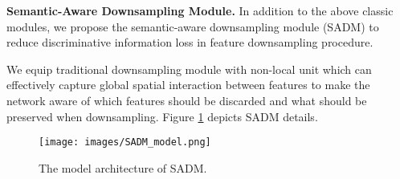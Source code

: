 \documentclass[final]{cvpr}
\begin{document}
\textbf{Semantic-Aware Downsampling Module.}
In addition to the above classic modules, we propose the semantic-aware downsampling module (SADM) to reduce discriminative information loss in feature downsampling procedure.

We equip traditional downsampling module with non-local \cite{wang2018non} unit which can effectively capture global spatial interaction between features to make the network aware of which features should be discarded and what should be preserved when downsampling. Figure \ref{fig.SADM_model} depicts SADM details.

\begin{figure}[ht]
\centering
  \texttt{[image: images/SADM\_model.png]}
\centering
\caption{The model architecture of SADM.}
\label{fig.SADM_model}
\end{figure}


\begin{table}[ht]
\caption{CPNet body architecture. Residual blocks are highlighted with gray background.}
\label{table.backbone}
\centering
{}
\end{table}
\end{document}
